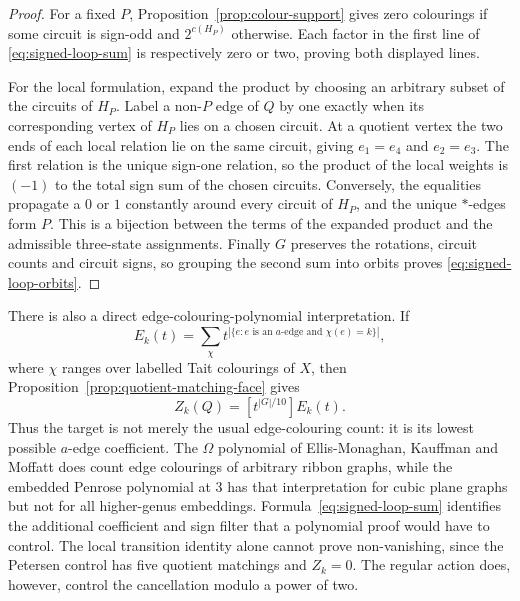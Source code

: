 \documentclass[11pt,a4paper]{article}
\theoremstyle{definition}
\theoremstyle{remark}
\begin{document}
\begin{proof}
For a fixed $P$, Proposition~\ref{prop:colour-support} gives zero colourings if some circuit is sign-odd and $2^{c(H_P)}$ otherwise.  Each factor in the first line of \eqref{eq:signed-loop-sum} is respectively zero or two, proving both displayed lines.

For the local formulation, expand the product by choosing an arbitrary subset of the circuits of $H_P$.  Label a non-$P$ edge of $Q$ by one exactly when its corresponding vertex of $H_P$ lies on a chosen circuit.  At a quotient vertex the two ends of each local relation lie on the same circuit, giving $e_1=e_4$ and $e_2=e_3$.  The first relation is the unique sign-one relation, so the product of the local weights is $(-1)$ to the total sign sum of the chosen circuits.  Conversely, the equalities propagate a $0$ or $1$ constantly around every circuit of $H_P$, and the unique $\ast$-edges form $P$.  This is a bijection between the terms of the expanded product and the admissible three-state assignments.  Finally $G$ preserves the rotations, circuit counts and circuit signs, so grouping the second sum into orbits proves \eqref{eq:signed-loop-orbits}.
\end{proof}

There is also a direct edge-colouring-polynomial interpretation.  If
\[
 E_k(t)=\sum_{\chi}t^{|\{e:e\text{ is an $a$-edge and }\chi(e)=k\}|},
\]
where $\chi$ ranges over labelled Tait colourings of $X$, then Proposition~\ref{prop:quotient-matching-face} gives
\[
 Z_k(Q)=[t^{|G|/10}]E_k(t).
\]
Thus the target is not merely the usual edge-colouring count: it is its lowest possible $a$-edge coefficient.  The $\Omega$ polynomial of Ellis-Monaghan, Kauffman and Moffatt \cite{EllisMonaghanKauffmanMoffatt18} does count edge colourings of arbitrary ribbon graphs, while the embedded Penrose polynomial at $3$ has that interpretation for cubic plane graphs but not for all higher-genus embeddings.  Formula~\eqref{eq:signed-loop-sum} identifies the additional coefficient and sign filter that a polynomial proof would have to control.  The local transition identity alone cannot prove non-vanishing, since the Petersen control has five quotient matchings and $Z_k=0$.  The regular action does, however, control the cancellation modulo a power of two.
\end{document}
